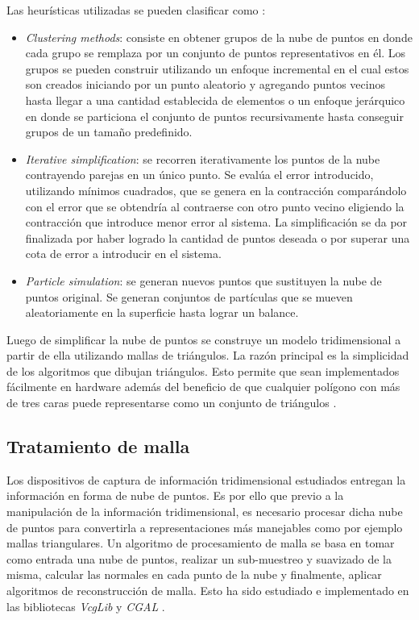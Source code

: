 Las heurísticas utilizadas se pueden clasificar como \cite{PntCloud}:
\begin{itemize}
   \item \emph{Clustering methods}: consiste en obtener grupos de la nube de puntos en donde cada grupo se remplaza por un conjunto de puntos representativos en él. Los grupos se pueden construir utilizando un enfoque incremental en el cual estos son creados iniciando por un punto aleatorio y agregando puntos vecinos hasta llegar a una cantidad establecida de elementos o un enfoque jerárquico en donde se particiona el conjunto de puntos recursivamente hasta conseguir grupos de un tamaño predefinido.
   \item \emph{Iterative simplification}: se recorren iterativamente los puntos de la nube contrayendo parejas en un único punto. Se evalúa el error introducido, utilizando mínimos cuadrados, que se genera en la contracción comparándolo con el error que se obtendría al contraerse con otro punto vecino eligiendo la contracción que introduce menor error al sistema. La simplificación se da por finalizada por haber logrado la cantidad de puntos deseada o por superar una cota de error a introducir en el sistema.
   \item \emph{Particle simulation}: se generan nuevos puntos que sustituyen la nube de puntos original. Se generan conjuntos de partículas que se mueven aleatoriamente en la superficie hasta lograr un balance. %
\end{itemize}

Luego de simplificar la nube de puntos se construye un modelo tridimensional a partir de ella utilizando mallas de triángulos. La razón principal es la simplicidad de los algoritmos que dibujan triángulos. Esto permite que sean implementados fácilmente en hardware además del beneficio de que cualquier polígono con más de tres caras puede representarse como un conjunto de triángulos \cite{PCloudTriangle}.

\subsection{Tratamiento de malla}

Los dispositivos de captura de información tridimensional estudiados entregan la información en forma de nube de puntos. Es por ello que previo a la manipulación de la información tridimensional, es necesario procesar dicha nube de puntos para convertirla a representaciones más manejables como por ejemplo mallas triangulares.
Un algoritmo de procesamiento de malla se basa en tomar como entrada una nube de puntos, realizar un sub-muestreo y suavizado de la misma, calcular las normales en cada punto de la nube y finalmente, aplicar algoritmos de reconstrucción de malla. Esto ha sido estudiado e implementado en las bibliotecas \emph{VcgLib} \cite{VCGLib} y \emph{CGAL} \cite{CGAL}.

